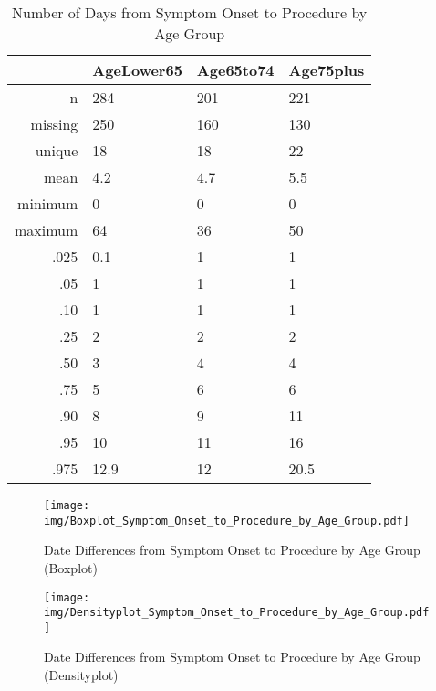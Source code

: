 \documentclass[a4paper]{report}
\begin{document}
\begin{itemize}
{%
\begin{table}[ht]
\centering
\begin{tabular}{rlll}
  \toprule
 & AgeLower65 & Age65to74 & Age75plus \\ 
  \midrule
n & 284 & 201 & 221 \\ 
  missing & 250 & 160 & 130 \\ 
  unique & 18 & 18 & 22 \\ 
  mean & 4.2 & 4.7 & 5.5 \\ 
  minimum & 0 & 0 & 0 \\ 
  maximum & 64 & 36 & 50 \\ 
  .025 & 0.1 & 1 & 1 \\ 
  .05 & 1 & 1 & 1 \\ 
  .10 & 1 & 1 & 1 \\ 
  .25 & 2 & 2 & 2 \\ 
  .50 & 3 & 4 & 4 \\ 
  .75 & 5 & 6 & 6 \\ 
  .90 & 8 & 9 & 11 \\ 
  .95 & 10 & 11 & 16 \\ 
  .975 & 12.9 & 12 & 20.5 \\ 
   \bottomrule
\end{tabular}
\caption{Number of Days from Symptom Onset to Procedure by Age Group} 
\end{table}
\begin{figure}
  \centering
  \caption{Date Differences from Symptom Onset to Procedure by Age Group (Boxplot)}
  \label{Boxplot: Date Differences from Symptom Onset to Procedure by Age Group}
\texttt{[image: img/Boxplot\_Symptom\_Onset\_to\_Procedure\_by\_Age\_Group.pdf]}\end{figure}


\begin{figure}
  \centering
  \caption{Date Differences from Symptom Onset to Procedure by Age Group (Densityplot)}
  \label{Density: Date Differences from Symptom Onset to Procedure by Age Group}
\texttt{[image: img/Densityplot\_Symptom\_Onset\_to\_Procedure\_by\_Age\_Group.pdf]}\end{figure}


\clearpage

}
\end{itemize}
\end{document}
